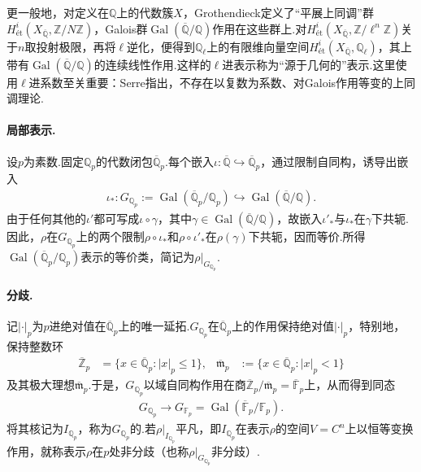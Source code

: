 \begin{example*}

更一般地，对定义在$\mathbb Q$上的代数簇$X$，Grothendieck定义了``平展上同调''群$H^i_{\text{ét}}(X_{\overline{\mathbb Q}},\mathbb Z/N\mathbb Z)$，Galois群$\operatorname{Gal}(\overline{\mathbb Q}/\mathbb Q)$作用在这些群上.对$H^i_{\text{ét}}(X_{\overline{\mathbb Q}},\mathbb Z/\ell^n\mathbb Z)$关于$n$取投射极限，再将$\ell$逆化，便得到$\mathbb Q_\ell$上的有限维向量空间$H^i_{\text{ét}}(X_{\overline{\mathbb Q}},\mathbb Q_\ell)$，其上带有$\operatorname{Gal}(\overline{\mathbb Q}/\mathbb Q)$的连续线性作用.这样的$\ell$进表示称为``源于几何的''表示.这里使用$\ell$进系数至关重要：Serre指出，不存在以复数为系数、对Galois作用等变的上同调理论.

\end{example*}



\paragraph{局部表示.}

设$p$为素数.固定$\mathbb Q_p$的代数闭包$\overline{\mathbb Q}_p$.每个嵌入$\iota:\overline{\mathbb Q}\hookrightarrow\overline{\mathbb Q}_p$，通过限制自同构，诱导出嵌入
\begin{align*}
\iota_*:G_{\mathbb Q_p}:=\operatorname{Gal}(\overline{\mathbb Q}_p/\mathbb Q_p)
\hookrightarrow\operatorname{Gal}(\overline{\mathbb Q}/\mathbb Q).
\end{align*}
由于任何其他的$\iota'$都可写成$\iota\circ\gamma$，其中$\gamma\in\operatorname{Gal}(\overline{\mathbb Q}/\mathbb Q)$，故嵌入$\iota'_*$与$\iota_*$在$\gamma$下共轭.因此，$\rho$在$G_{\mathbb Q_p}$上的两个限制$\rho\circ\iota_*$和$\rho\circ\iota'_*$在$\rho(\gamma)$下共轭，因而等价.所得$\operatorname{Gal}(\overline{\mathbb Q}_p/\mathbb Q_p)$表示的等价类，简记为$\rho|_{G_{\mathbb Q_p}}$.



\paragraph{分歧.}

记$|\cdot|_p$为$p$进绝对值在$\overline{\mathbb Q}_p$上的唯一延拓.$G_{\mathbb Q_p}$在$\overline{\mathbb Q}_p$上的作用保持绝对值$|\cdot|_p$，特别地，保持整数环
\begin{align*}
\overline{\mathbb Z}_p&=\{x\in\overline{\mathbb Q}_p:|x|_p\leqslant1\},&
\overline{\mathfrak m}_p&:=\{x\in\overline{\mathbb Q}_p:|x|_p<1\}
\end{align*}
及其极大理想$\overline{\mathfrak m}_p$.于是，$G_{\mathbb Q_p}$以域自同构作用在商$\overline{\mathbb Z}_p/\overline{\mathfrak m}_p=\overline{\mathbb F}_p$上，从而得到同态
\begin{align*}
G_{\mathbb Q_p}\longrightarrow G_{\mathbb F_p}=\operatorname{Gal}(\overline{\mathbb F}_p/\mathbb F_p).
\end{align*}
将其核记为$I_{\mathbb Q_p}$，称为$G_{\mathbb Q_p}$的.若$\rho|_{I_{\mathbb Q_p}}$平凡，即$I_{\mathbb Q_p}$在表示$\rho$的空间$V=C^n$上以恒等变换作用，就称表示$\rho$在$p$处非分歧（也称$\rho|_{G_{\mathbb Q_p}}$非分歧）.

